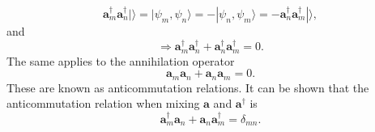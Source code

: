 \documentclass[a4paper,norsk,11pt,twoside]{report}
\begin{document}
\begin{equation}
\textbf{a}^{\dag}_m \textbf{a}^{\dag}_n | \rangle = |\psi_m, \psi_n \rangle = - |\psi_n, \psi_m \rangle = -\textbf{a}^{\dag}_n \textbf{a}^{\dag}_m | \rangle,
\end{equation}
and
\begin{equation}
\Rightarrow \textbf{a}^{\dag}_m \textbf{a}^{\dag}_n + \textbf{a}^{\dag}_n \textbf{a}^{\dag}_m = 0 .
\end{equation}
The same applies to the annihilation operator
\begin{equation}
\textbf{a}_m \textbf{a}_n + \textbf{a}_n \textbf{a}_m = 0 .
\end{equation}
These are known as anticommutation relations. It can be shown that the anticommutation relation when mixing $\textbf{a}$ and $\textbf{a}^{\dag}$ is
\begin{equation}
\textbf{a}^{\dag}_m \textbf{a}_n + \textbf{a}_n \textbf{a}^{\dag}_m = \delta_{mn} . \label{ccsd_anni_creato_operator_combo}
\end{equation}
\end{document}

